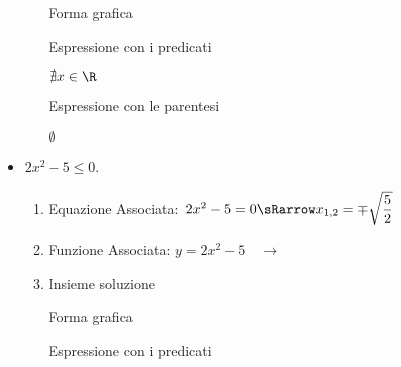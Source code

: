 \begin{esempio}
\begin{itemize}
\begin{enumerate}
  \begin{minipage}{.32\textwidth}
  Forma grafica\\[-.7em]

 \begin{center}
  \vspace{.4em}
 \end{center}
  \end{minipage}
  \begin{minipage}{.32\textwidth}
  Espressione con i predicati\\[-.3em]

 \begin{center}
  \(\nexists x \in \R\)
  \vspace{1em}
 \end{center}
  \end{minipage}
  \begin{minipage}{.32\textwidth}
  Espressione con le parentesi\\[-.3em]

 \begin{center}
  \(\emptyset\)
  \vspace{.8em}
 \end{center}
  \end{minipage}
\end{enumerate}

\item \(2x^2-5 \le 0\).

\begin{enumerate}
 \item
  Equazione Associata:~\(2x^2-5=0 \sRarrow
                        x_{1, 2}= \mp \sqrt{\dfrac{5}{2}}\)
 \item
  \begin{minipage}{.45\textwidth}
  Funzione Associata: \(y = 2x^2-5 \quad \rightarrow\)
  \end{minipage}
  \begin{minipage}{.30\textwidth}
  \end{minipage}
 \item
 Insieme soluzione\\

  \begin{minipage}{.32\textwidth}
  Forma grafica\\[-.7em]

 \begin{center}
  \vspace{.4em}
 \end{center}
  \end{minipage}
  \begin{minipage}{.32\textwidth}
  Espressione con i predicati\\[-.3em]


\end{minipage}
\end{enumerate}
\end{itemize}
\end{esempio}

